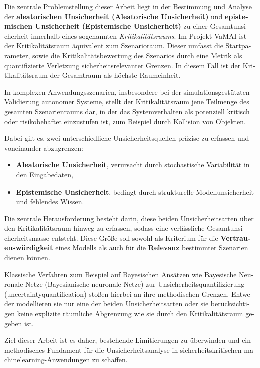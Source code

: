 \begin{otherlanguage}{ngerman}
Die zentrale Problemstellung dieser Arbeit liegt in der Bestimmung und Analyse der \textbf{aleatorischen Unsicherheit (\gls{Aleatorische Unsicherheit})} und \textbf{epistemischen Unsicherheit (\gls{Epistemische Unsicherheit})} zu einer Gesamtunsicherheit innerhalb eines sogenannten \emph{Kritikalitätsraums}. Im Projekt VaMAI ist der Kritikalitätsraum äquivalent zum Szenarioraum. Dieser umfasst die Startparameter, sowie die Kritikalitätsbewertung des Szenarios durch eine Metrik als quantifizierte Verletzung sicherheitsrelevanter Grenzen. In diesem Fall ist der Kritikalitätsraum der Gesamtraum als höchste Raumeinheit. \newline


In komplexen Anwendungsszenarien, insbesondere bei der simulationsgestützten Validierung autonomer Systeme, stellt der Kritikalitätsraum jene Teilmenge des gesamten Szenarienraums dar, in der das Systemverhalten als potenziell kritisch oder risikobehaftet einzustufen ist, zum Beispiel durch Kollision von Objekten.\newline

Dabei gilt es, zwei unterschiedliche Unsicherheitsquellen präzise zu erfassen und voneinander abzugrenzen:

\begin{itemize}
  \item \textbf{\gls{Aleatorische Unsicherheit}}, verursacht durch stochastische Variabilität in den Eingabedaten,
  \item \textbf{\gls{Epistemische Unsicherheit}}, bedingt durch strukturelle Modellunsicherheit und fehlendes Wissen.
\end{itemize}

Die zentrale Herausforderung besteht darin, diese beiden Unsicherheitsarten über den Kritikalitätsraum hinweg zu erfassen, sodass eine verlässliche Gesamtunsicherheitsmasse entsteht. Diese Größe soll sowohl als Kriterium für die \textbf{Vertrauenswürdigkeit} eines Modells als auch für die \textbf{Relevanz} bestimmter Szenarien dienen können.\newline

Klassische Verfahren zum Beispiel auf Bayesischen Ansätzen wie Bayesische Neuronale Netze (\gls{Bayesianische neuronale Netze}) zur Unsicherheitsquantifizierung (\gls{uncertaintyquantification}) stoßen hierbei an ihre methodischen Grenzen. Entweder modellieren sie nur eine der beiden Unsicherheitsarten oder sie berücksichtigen keine explizite räumliche Abgrenzung wie sie durch den Kritikalitätsraum gegeben ist.\newline

Ziel dieser Arbeit ist es daher, bestehende Limitierungen zu überwinden und ein methodisches Fundament für die Unsicherheitsanalyse in sicherheitskritischen \gls{machinelearning}-Anwendungen zu schaffen.



\end{otherlanguage}
